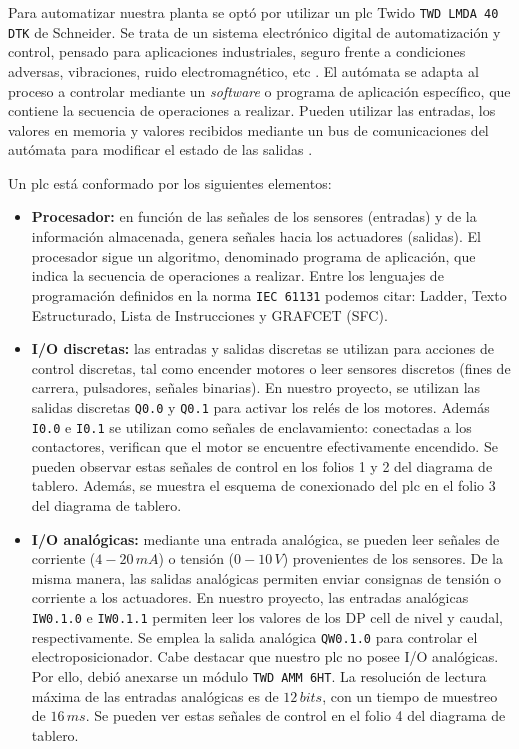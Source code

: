 Para automatizar nuestra planta se optó por utilizar un \gls{plc} Twido
\verb|TWD LMDA 40 DTK| de Schneider.
Se trata de un sistema electrónico digital de automatización y control, pensado
para aplicaciones industriales, seguro frente a condiciones adversas,
vibraciones, ruido electromagnético, etc \cite{bib:ApuntesJGabriel}.
El autómata se adapta al proceso a controlar mediante un
\textit{software} o programa de aplicación específico, que contiene la secuencia
de operaciones a realizar.
Pueden utilizar las entradas, los valores en memoria y valores
recibidos mediante un bus de comunicaciones del autómata para modificar el
estado de las salidas \cite{bib:libroAutomat1}.

Un \gls{plc} está conformado por los siguientes elementos:
\begin{itemize}
 \item \textbf{Procesador:} en función de las señales de los sensores
(entradas) y de la información almacenada, genera señales hacia los actuadores
(salidas).
El procesador sigue un algoritmo, denominado programa de aplicación,
que indica la secuencia de operaciones a realizar.
Entre los lenguajes de programación definidos en la norma \verb|IEC 61131|
podemos citar: Ladder, Texto Estructurado, Lista de Instrucciones y GRAFCET
(SFC).
 \item \textbf{I/O discretas:} las entradas y salidas discretas se
utilizan para acciones de control discretas, tal como encender motores
o leer sensores discretos (fines de carrera, pulsadores, señales binarias).
En nuestro proyecto, se utilizan las salidas discretas \verb|Q0.0| y \verb|Q0.1|
para activar los relés de los motores.
Además \verb|I0.0| e \verb|I0.1| se
utilizan como señales de enclavamiento: conectadas a los contactores, verifican
que el motor se encuentre efectivamente encendido.
Se pueden observar estas señales de control en los folios 1 y 2 del diagrama de
tablero.
Además, se muestra el esquema de conexionado del \gls{plc} en el folio
3 del diagrama de tablero.
\item \textbf{I/O analógicas:} mediante una entrada
analógica, se pueden leer
señales de corriente ($4-20\,mA$) o tensión ($0-10\,V$) provenientes de los
sensores.
De la misma manera, las salidas analógicas permiten enviar consignas
de tensión o corriente a los actuadores.
En nuestro proyecto, las entradas analógicas \verb|IW0.1.0| e \verb|IW0.1.1|
permiten leer los valores de los DP cell de nivel y caudal, respectivamente.
Se emplea la salida analógica \verb|QW0.1.0| para controlar el
electroposicionador.
Cabe destacar que nuestro \gls{plc} no posee I/O analógicas.
Por ello, debió anexarse un módulo \verb|TWD AMM 6HT|.
La resolución de lectura máxima de las entradas analógicas es de $12\,bits$,
con un tiempo de muestreo de $16\,ms$.
Se pueden ver estas señales de control en el folio 4 del diagrama de tablero.


\end{itemize}
